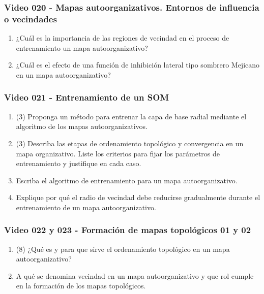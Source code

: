 \documentclass[a4paper,10pt,spanish,oneside]{article}
\begin{document}
\subsubsection{Video 020 - Mapas autoorganizativos. Entornos de influencia o vecindades}

\begin{enumerate}
\item ¿Cuál es la importancia de las regiones de vecindad en el proceso de entrenamiento un mapa autoorganizativo?

\item ¿Cuál es el efecto de una función de inhibición lateral tipo sombrero Mejicano en un mapa autoorganizativo?
\end{enumerate}

\subsubsection{Video 021 - Entrenamiento de un SOM}

\begin{enumerate}
\item (3) Proponga un método para entrenar la capa de base radial mediante el algoritmo de los mapas autoorganizativos.

\item (3) Describa las etapas de ordenamiento topológico y convergencia en un mapa organizativo. Liste los criterios para fijar los parámetros de entrenamiento y justifique en cada caso.

\item Escriba el algoritmo de entrenamiento para un mapa autoorganizativo.

\item Explique por qué el radio de vecindad debe reducirse gradualmente durante el entrenamiento de un mapa autoorganizativo.
\end{enumerate}

\subsubsection{Video 022 y 023 - Formación de mapas topológicos 01 y 02}

\begin{enumerate}
\item (8) ¿Qué es y para que sirve el ordenamiento topológico en un mapa autoorganizativo?

\item A qué se denomina vecindad en un mapa autoorganizativo y que rol cumple en la formación de los mapas topológicos.
\end{enumerate}
\end{document}
